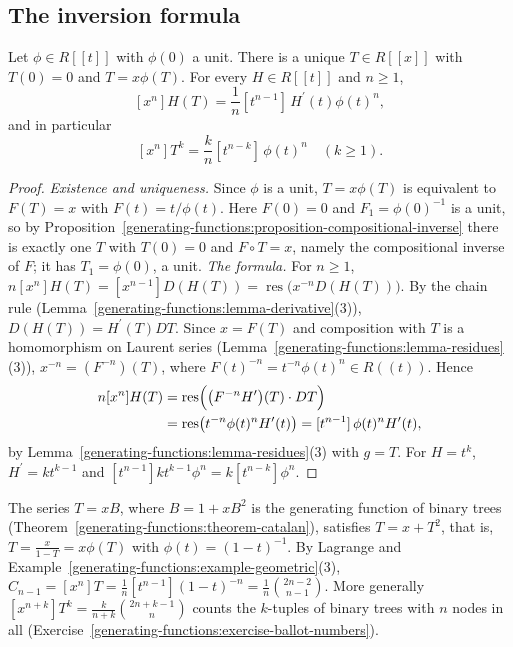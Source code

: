 \subsection{The inversion formula}\label{generating-functions:subsection-lagrange-formula}

\begin{theorem}\label{generating-functions:theorem-lagrange}
Let $\phi \in R[[t]]$ with $\phi(0)$ a unit. There is a unique $T \in R[[x]]$ with $T(0) = 0$ and $T = x\phi(T)$. For every $H \in R[[t]]$ and $n \geq 1$,
\[
[x^n]H(T) = \frac{1}{n}[t^{n-1}]\,H^{\prime}(t)\phi(t)^n,
\]
and in particular
\[
[x^n]T^k = \frac{k}{n}[t^{n-k}]\,\phi(t)^n \quad (k \geq 1).
\]
\end{theorem}

\begin{proof}
\emph{Existence and uniqueness.} Since $\phi$ is a unit, $T = x\phi(T)$ is equivalent to $F(T) = x$ with $F(t) = t/\phi(t)$. Here $F(0) = 0$ and $F_1 = \phi(0)^{-1}$ is a unit, so by
Proposition~\ref{generating-functions:proposition-compositional-inverse} there is exactly one $T$ with $T(0) = 0$ and $F \circ T = x$, namely the compositional inverse of $F$; it has $T_1 = \phi(0)$,
a unit.
\emph{The formula.} For $n \geq 1$, $n[x^n]H(T) = [x^{n-1}]D(H(T)) = \operatorname{res}\bigl(x^{-n}D(H(T))\bigr)$. By the chain rule (Lemma~\ref{generating-functions:lemma-derivative}(3)), $D(H(T)) = H^{\prime}(T)DT$. Since $x = F(T)$ and composition with $T$
is a homomorphism on Laurent series (Lemma~\ref{generating-functions:lemma-residues}(3)), $x^{-n} = (F^{-n})(T)$, where $F(t)^{-n} = t^{-n}\phi(t)^n \in R((t))$. Hence
\[
\begin{aligned}
n[x^n]H(T) &= \operatorname{res}\Bigl(\bigl(F^{-n}H^{\prime}\bigr)(T) \cdot DT\Bigr)\\
&= \operatorname{res}\bigl(t^{-n}\phi(t)^nH^{\prime}(t)\bigr) = [t^{n-1}]\,\phi(t)^nH^{\prime}(t),
\end{aligned}
\]
by Lemma~\ref{generating-functions:lemma-residues}(3) with $g = T$. For $H = t^k$, $H^{\prime} = kt^{k-1}$ and $[t^{n-1}]kt^{k-1}\phi^n = k[t^{n-k}]\phi^n$.
\end{proof}

\begin{example}\label{generating-functions:example-lagrange-catalan}
The series $T = xB$, where $B = 1 + xB^2$ is the generating function of binary trees (Theorem~\ref{generating-functions:theorem-catalan}), satisfies $T = x + T^2$, that is, $T = \frac{x}{1 - T} = x\phi(T)$ with $\phi(t) = (1 - t)^{-1}$.
By Lagrange and Example~\ref{generating-functions:example-geometric}(3), $C_{n-1} = [x^n]T = \frac{1}{n}[t^{n-1}](1 - t)^{-n} = \frac{1}{n}\binom{2n - 2}{n - 1}$. More generally
$[x^{n+k}]T^k = \frac{k}{n + k}\binom{2n + k - 1}{n}$ counts the $k$-tuples of binary trees with $n$ nodes in all (Exercise~\ref{generating-functions:exercise-ballot-numbers}).
\end{example}

